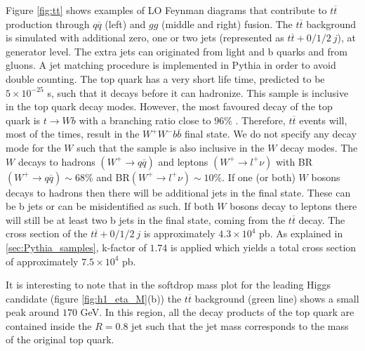Figure \ref{fig:tt} shows examples of LO Feynman diagrams that contribute to $t\overline{t}$ production through $q\overline{q}$ (left) and $gg$ (middle and right) fusion. The $t\overline{t}$ background is simulated with additional zero, one or two jets (represented as $t\overline{t}+0/1/2 ~j$), at generator level. The extra jets can originated from light and b quarks and from gluons. A jet matching procedure is implemented in Pythia in order to avoid double counting. The top quark has a very short life time, predicted to be $5\times 10^{-25}$ s, such that it decays before it can hadronize. This sample is inclusive in the top quark decay modes. However, the most favoured decay of the top quark is $t\rightarrow Wb$ with a branching ratio close to $96\%$ \cite{PDG2016}. Therefore, $t\overline{t}$ events will, most of the times, result in the $W^+W^-b\overline{b}$ final state. We do not specify any decay mode for the $W$ such that the sample is also inclusive in the $W$ decay modes. The $W$ decays to hadrons $(W^+\rightarrow q\overline{q})$ and leptons $(W^+\rightarrow l^+\nu)$ with BR$(W^+\rightarrow q\overline{q})\sim 68\%$ and BR$(W^+\rightarrow l^+\nu)\sim 10\%$. If one (or both) $W$ bosons decays to hadrons then there will be additional jets in the final state. These can be b jets or can be misidentified as such. If both $W$ bosons decay to leptons there will still be at least two b jets in the final state, coming from the $t\overline{t}$ decay. The cross section of the $t\overline{t}+0/1/2 ~j$ is approximately $4.3\times 10^4$ pb. As explained in \ref{sec:Pythia_samples}, k-factor of $1.74$ is applied which yields a total cross section of approximately $7.5\times 10^{4}$ pb.

It is interesting to note that in the softdrop mass plot for the leading Higgs candidate (figure \ref{fig:h1_eta_M}(b)) the $t\overline{t}$ background (green line) shows a small peak around $170$ GeV. In this region, all the decay products of the top quark are contained inside the $R=0.8$ jet such that the jet mass corresponds to the mass of the original top quark.


